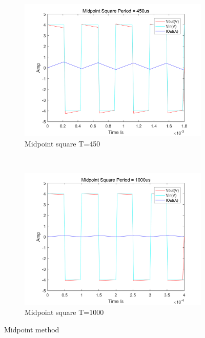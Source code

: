 \documentclass[a4paper, 12pt]{article}
\begin{document}
\begin{figure}[h]
\begin{subfigure}[b]{0.4\textwidth}
            \includegraphics[width=\textwidth]{ex1/midpoint_square_450.png}
            \caption{Midpoint square T=450}
      \end{subfigure}
       ~
      \begin{subfigure}[b]{0.4\textwidth}
            \includegraphics[width=\textwidth]{ex1/midpoint_square_1000.png}
            \caption{Midpoint square T=1000}
      \end{subfigure}
      \caption{Midpoint method}
\end{figure}
\newpage
\end{document}
